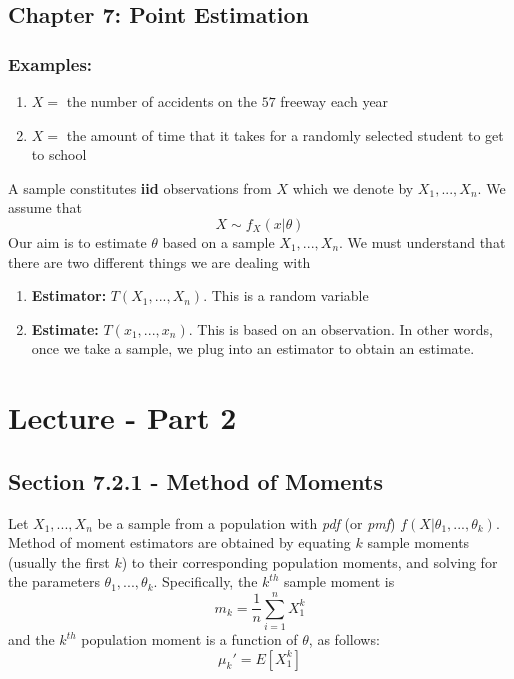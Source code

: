 \documentclass{article}
\begin{document}
\subsection{Chapter 7: Point Estimation}

\subsubsection*{Examples:}
\begin{enumerate}
    \item $X = $ the number of accidents on the $57$ freeway each year
    \item $X=$ the amount of time that it takes for a randomly selected student to get to school
\end{enumerate}
A sample constitutes \textbf{iid} observations from $X$ which we denote by $X_1,...,X_n$. We assume that
\begin{equation*}
    X \sim f_X(x|\theta)
\end{equation*}
Our aim is to estimate $\theta$ based on a sample $X_1,...,X_n$. We must understand that there are two different things we are dealing with
\begin{enumerate}
    \item \textbf{Estimator:} $T(X_1,...,X_n)$. This is a random variable
    \item \textbf{Estimate:} $T(x_1,...,x_n)$. This is based on an observation. In other words, once we take a sample, we plug into an estimator to obtain an estimate.
\end{enumerate}

\section{Lecture - Part 2}
\subsection{Section 7.2.1 - Method of Moments}

Let $X_1,...,X_n$ be a sample from a population with \textit{pdf} (or \textit{pmf}) $f(X|\theta_1,...,\theta_k)$. Method of moment estimators are obtained by equating $k$ sample moments (usually the first $k$) to their corresponding population moments, and solving for the parameters $\theta_1,...,\theta_k$. Specifically, the $k^{th}$ sample moment is
\begin{equation*}
    m_k = \frac{1}{n}\sum_{i=1}^n X_1^k
\end{equation*}
and the $k^{th}$ population moment is a function of $\theta$, as follows:
\begin{equation*}
    \mu_k' = E[X_1^k]
\end{equation*}
\end{document}

